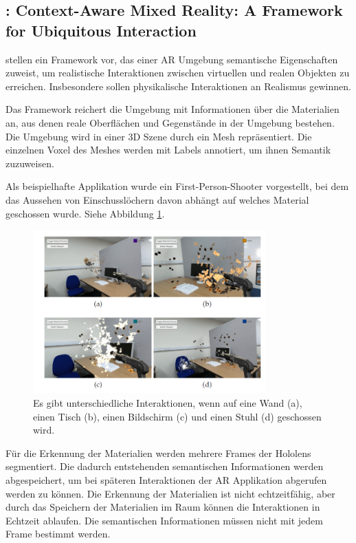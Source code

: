 \subsection{\cite{contextawaremixedreality}: Context-Aware Mixed Reality: A Framework for Ubiquitous Interaction}

\cite{contextawaremixedreality} stellen ein Framework vor, das einer AR Umgebung semantische Eigenschaften zuweist, um realistische Interaktionen zwischen virtuellen und realen Objekten zu erreichen. 
Insbesondere sollen physikalische Interaktionen an Realismus gewinnen.

Das Framework reichert die Umgebung mit Informationen über die Materialien an, aus denen reale Oberflächen und Gegenstände in der Umgebung bestehen. 
Die Umgebung wird in einer 3D Szene durch ein Mesh repräsentiert. Die einzelnen Voxel des Meshes werden mit Labels annotiert, um ihnen Semantik zuzuweisen.

Als beispielhafte Applikation wurde ein First-Person-Shooter vorgestellt, bei dem das Aussehen von Einschusslöchern davon abhängt auf welches Material geschossen wurde. Siehe Abbildung \ref{img:game}.

\begin{figure}[H]
	\centering
	\includegraphics[width=0.8\textwidth]{images/img_shootinggame.png}
	\caption[Context Aware Shooter von \cite{contextawaremixedreality}]{Es gibt unterschiedliche Interaktionen, wenn auf eine Wand (a), einen Tisch (b), einen Bildschirm (c) und einen Stuhl (d) geschossen wird.\citep{contextawaremixedreality}}
	\label{img:game}
\end{figure}

Für die Erkennung der Materialien werden mehrere Frames der Hololens segmentiert.
Die dadurch entstehenden semantischen Informationen werden abgespeichert, um bei späteren Interaktionen der AR Applikation abgerufen werden zu können. Die Erkennung der Materialien ist nicht echtzeitfähig, aber durch das Speichern der Materialien im Raum können die Interaktionen in Echtzeit ablaufen. Die semantischen Informationen müssen nicht mit jedem Frame bestimmt werden.


